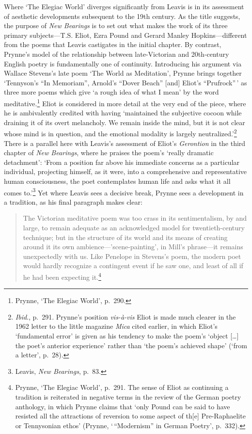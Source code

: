 \documentclass[]{article}
\begin{document}
\noindent Where `The Elegiac World' diverges significantly from Leavis
is in its assessment of aesthetic developments subsequent to the 19th
century. As the title suggests, the purpose of \emph{New Bearings} is to
set out what makes the work of its three primary subjects---T.S. Eliot,
Ezra Pound and Gerard Manley Hopkins---different from the poems that
Leavis castigates in the initial chapter. By contrast, Prynne's model of
the relationship between late-Victorian and 20th-century English poetry
is fundamentally one of continuity. Introducing his argument via Wallace
Stevens's late poem `The World as Meditation', Prynne brings together
`Tennyson's ``In Memoriam'', Arnold's ``Dover Beach'' {[}and{]} Eliot's
``Prufrock''\,' as three more poems which give `a rough idea of what I
mean' by the word meditative.\footnote{Prynne, `The Elegiac World',
  p.~290.} Eliot is considered in more detail at the very end of the
piece, where he is ambivalently credited with having `maintained the
subjective cocoon while draining it of its overt melancholy. We remain
inside the mind, but it is not clear whose mind is in question, and the
emotional modality is largely neutralized.'\footnote{\emph{Ibid}.,
  p.~291. Prynne's position \emph{vis-à-vis} Eliot is made much clearer
  in the 1962 letter to the little magazine \emph{Mica} cited earlier,
  in which Eliot's `fundamental error' is given as his tendency to make
  the poem's `object {[}\ldots{}{]} the poet's anterior experience'
  rather than `the poem's achieved shape' (`from a letter', p.~28).}
There is a parallel here with Leavis's assessment of Eliot's
\emph{Gerontion} in the third chapter of \emph{New Bearings}, where he
praises the poem's `really dramatic detachment': `From a position far
above his immediate concerns as a particular individual, projecting
himself, as it were, into a comprehensive and representative human
consciousness, the poet contemplates human life and asks what it all
comes to.'\footnote{Leavis, \emph{New Bearings}, p.~83.} Yet where
Leavis sees a decisive break, Prynne sees a development in a tradition,
as his final paragraph makes clear:

\begin{quote}
The Victorian meditative poem was too crass in its sentimentalism, by
and large, to remain adequate as an acknowledged model for
twentieth-century technique; but in the structure of its world and its
means of creating around it its own ambience---'scene-painting', in
Mill's phrase---it remains unexpectedly with us. Like Penelope in
Stevens's poem, the modern poet would hardly recognize a contingent
event if he saw one, and least of all if he had been expecting
it.\footnote{Prynne, `The Elegiac World', p.~291. The sense of Eliot as
  continuing a tradition is reiterated in negative terms in the review
  of the German poetry anthology, in which Prynne claims that `only
  Pound can be said to have resisted all the attractions of reversion to
  some aspect of th{[}e{]} Pre-Raphaelite or Tennysonian ethos' (Prynne,
  `\,``Modernism'' in German Poetry', p.~332).}
\end{quote}
\end{document}
